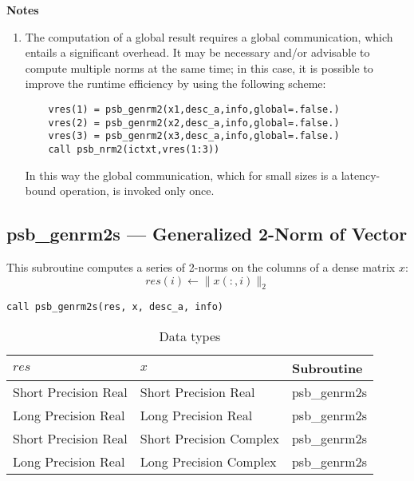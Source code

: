 {\par\noindent\large\bfseries Notes}
\begin{enumerate}
\item The computation of a global result requires a global
  communication, which entails a significant overhead. It may be
  necessary and/or advisable to compute multiple norms at the same 
  time; in this case, it is possible to improve the runtime efficiency
  by using the following scheme:
  \begin{lstlisting}
    vres(1) = psb_genrm2(x1,desc_a,info,global=.false.)
    vres(2) = psb_genrm2(x2,desc_a,info,global=.false.)
    vres(3) = psb_genrm2(x3,desc_a,info,global=.false.)
    call psb_nrm2(ictxt,vres(1:3))
  \end{lstlisting}
  In this way the global communication, which for small sizes is a
  latency-bound operation, is invoked only once.
\end{enumerate}



\clearpage\subsection*{psb\_genrm2s --- Generalized 2-Norm of Vector}

This subroutine computes a series of  2-norms on the columns of
a  dense matrix  $x$: 
\[ res(i) \leftarrow \|x(:,i)\|_2 \]


\begin{verbatim}
call psb_genrm2s(res, x, desc_a, info)
\end{verbatim}

\begin{table}[h]
\begin{center}
\begin{tabular}{lll}
\hline
$res$ & $x$ & {\bf Subroutine}\\
\hline
Short Precision Real&Short Precision Real & psb\_genrm2s \\
Long Precision Real&Long Precision Real & psb\_genrm2s \\
Short Precision Real&Short Precision Complex & psb\_genrm2s \\
Long Precision Real&Long Precision Complex & psb\_genrm2s \\
\hline
\end{tabular}
\end{center}
\caption{Data types\label{tab:f90nrm2s}}
\end{table}

